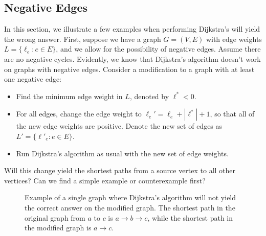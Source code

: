 \documentclass[11pt]{article}
\begin{document}
\subsection{Negative Edges}
In this section, we illustrate a few examples when performing Dijkstra's will yield the wrong answer. First, suppose we have a graph $G = (V, E)$ with edge weights $L = \{\ell_e : e \in E\}$, and we allow for the possibility of negative edges. Assume there are no negative cycles. Evidently, we know that Dijkstra's algorithm doesn't work on graphs with negative edges. Consider a modification to a graph with at least one negative edge:
\begin{itemize}
    \item Find the minimum edge weight in $L$, denoted by $\ell^* < 0$.
    \item For all edges, change the edge weight to $\ell_e' = \ell_e + |\ell^*| + 1$, so that all of the new edge weights are positive. Denote the new set of edges as $L' = \{\ell'_e: e \in E\}$.
    \item Run Dijkstra's algorithm as usual with the new set of edge weights. 
\end{itemize}
Will this change yield the shortest paths from a source vertex to all other vertices? Can we find a simple example or counterexample first?

\begin{figure}[H]
    \centering 
    
    \caption{Example of a single graph where Dijkstra's algorithm will not yield the correct answer on the modified graph. The shortest path in the original graph from $a$ to $c$ is $a \to b \to c$, while the shortest path in the modified graph is $a \to c$.}
\end{figure} 
\end{document}
